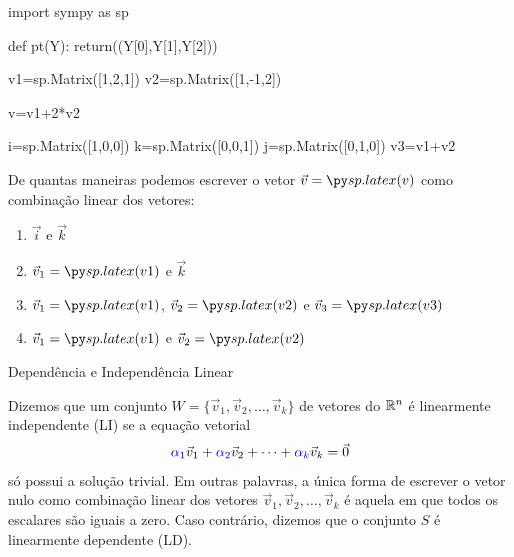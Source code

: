 \begin{frame}[label=lild,fragile]
\begin{pycode} 
import sympy as sp

def pt(Y):
 return((Y[0],Y[1],Y[2]))

v1=sp.Matrix([1,2,1])
v2=sp.Matrix([1,-1,2])

v=v1+2*v2

i=sp.Matrix([1,0,0])
k=sp.Matrix([0,0,1])
j=sp.Matrix([0,1,0])
v3=v1+v2

\end{pycode} 
\begin{exe}
De quantas maneiras podemos escrever o vetor \(\vec{v}=\pyl{v}\) como combinação linear dos vetores:

\begin{minipage}{0.4\textwidth}
\begin{enumerate}
\item \(\vec{i}\) e \(\vec{k}\)
\item \(\vec{v}_1=\pyl{v1}\) e \(\vec{k}\)
\end{enumerate}
\end{minipage}
\begin{minipage}{0.55\textwidth}
\begin{enumerate}
\setcounter{enumi}{2}
\item \(\vec{v}_1=\pyl{v1}\),  \(\vec{v}_2=\pyl{v2}\) e  \(\vec{v}_3=\pyl{v3}\)
\item \(\vec{v}_1=\pyl{v1}\) e \(\vec{v}_2=\pyl{v2}\)
\end{enumerate}
\end{minipage}

\end{exe}

\end{frame}



\begin{frame}[label=lild]{Dependência e Independência Linear}
\begin{defin}
Dizemos que um conjunto $W=\{\vec{v}_1,\vec{v}_2,\ldots,\vec{v}_k\}$ de vetores do $\mathbb{R}^n$ é {\color{blue} linearmente independente (LI)} se a equação vetorial
\[{\color{blue}\alpha_1}\vec{v}_1+{\color{blue}\alpha_2}\vec{v}_2+\cdots +{\color{blue}\alpha_k}\vec{v}_k=\vec{0}\]
{\color{red}só possui a solução trivial}. Em outras palavras, a única forma de escrever o vetor nulo como combinação linear dos vetores $\vec{v}_1,\vec{v}_2,\ldots, \vec{v}_k$ é aquela em que todos os escalares são iguais a zero. Caso contrário, dizemos que o conjunto $S$ é {\color{blue}linearmente dependente (LD)}.
\end{defin}
\end{frame}

